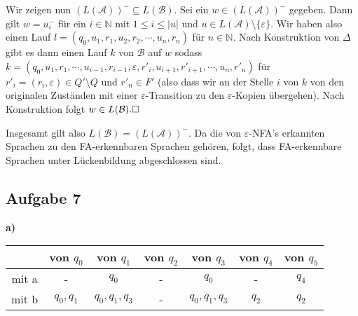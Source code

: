 \documentclass[a4paper,graphics,11pt]{article}
\newcommand{\aufgabe}[1]{\subsection*{Aufgabe #1}}
\begin{document}
Wir zeigen nun $(L(\mathcal{A}))^- \subseteq L(\mathcal{B})$.
Sei ein $w \in (L(\mathcal{A}))^-$ gegeben. Dann gilt $w = u_i^-$ für ein $i \in \mathbb{N}$
mit $1 \leq i \leq |u|$ und $u \in L(\mathcal{A})\setminus \{\varepsilon\}$.
Wir haben also einen Lauf $l = (q_0, u_1, r_1, u_2, r_2, \cdots, u_n, r_n)$
für $n \in \mathbb{N}$.
Nach Konstruktion von $\Delta$ gibt es dann einen Lauf $k$ von $\mathcal{B}$ auf $w$ sodass\\
$k = (q_0, u_1, r_1, \cdots, u_{i-1}, r_{i-1}, \varepsilon, r'_i, u_{i+1}, r'_{i+1}, \cdots,
u_n, r'_n)$ für $r'_i = (r_i, \varepsilon) \in Q' \setminus Q$ und $r'_n \in F'$
(also dass wir an der Stelle $i$ von $k$ von den originalen Zuständen mit einer $\varepsilon$-Transition zu
den $\varepsilon$-Kopien übergehen).
Nach Konstruktion folgt $w \in L(\mathcal{B}).\hfill\square$

Insgesamt gilt also $L(\mathcal{B}) = (L(\mathcal{A}))^-$. Da die von $\varepsilon$-NFA's
erkannten Sprachen zu den FA-erkennbaren Sprachen gehören, folgt, dass FA-erkennbare
Sprachen unter Lückenbildung abgeschlossen sind.

\aufgabe{7}
\textbf{a)}
\begin{center}
    \begin{tabular}{ c | c | c | c | c | c | c}
        & von $q_0$ & von $q_1$ & von $q_2$ & von $q_3$ & von $q_4$ & von $q_5$\\
        \hline
        mit a & -           & $q_0$             & - & $q_0$             & - & $q_4$ \\ \hline
        mit b & $q_0, q_1$  & $q_0, q_1, q_3$   & - & $q_0, q_1, q_3$   & $q_2$ & $q_2$\\
    \end{tabular}
\end{center}

\newpage
\end{document}
